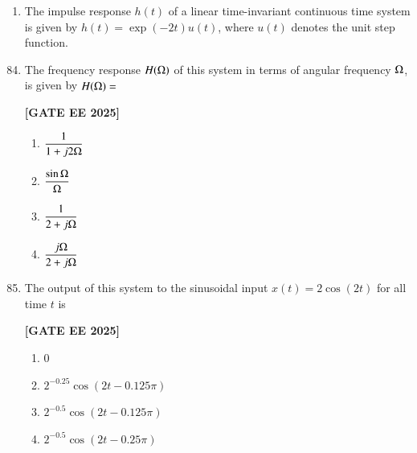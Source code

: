 \documentclass[12pt]{article}
\begin{document}
\begin{enumerate}
\item The impulse response $h(t)$ of a linear time-invariant continuous time system is given by
$h(t) = \exp(-2 t) u(t)$, where $u(t)$ denotes the unit step function.
\end{enumerate}
\begin{enumerate}[leftmargin=*, label=\textbf{Q.\arabic*:}]
\setcounter{enumi}{83}

\item The frequency response $H(\ohm)$ of this system in terms of angular frequency $\ohm$, is given by $H(\ohm) = $
 
\noindent \textbf{[GATE EE 2025]}
\begin{multicols}{4}
\begin{enumerate}
  \item $\dfrac{1}{1 + j2\ohm}$
  \item $\dfrac{\sin \ohm}{\ohm}$
  \item $\dfrac{1}{2 + j\ohm}$
  \item $\dfrac{j\ohm}{2 + j\ohm}$
\end{enumerate}
\end{multicols}

\item The output of this system to the sinusoidal input $x(t) = 2 \cos (2t)$ for all time $t$ is
 
\noindent \textbf{[GATE EE 2025]}
\begin{multicols}{2}
\begin{enumerate}
  \item $0$
  \item $2^{-0.25} \cos (2t - 0.125\pi)$
  \item $2^{-0.5} \cos (2t - 0.125\pi)$
  \item $2^{-0.5} \cos (2t - 0.25\pi)$
\end{enumerate}
\end{multicols}

\end{enumerate}
\end{document}
